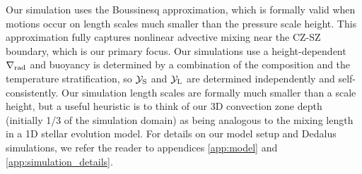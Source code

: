 Our simulation uses the Boussinesq approximation, which is formally valid when motions occur on length scales much smaller than the pressure scale height.
This approximation fully captures nonlinear advective mixing near the CZ-SZ boundary, which is our primary focus.
Our simulations use a height-dependent $\nabla_{\rm{rad}}$ and buoyancy is determined by a combination of the composition and the temperature stratification, so $\mathcal{Y}_{\rm{S}}$ and $\mathcal{Y}_{\rm{L}}$ are determined independently and self-consistently.
Our simulation length scales are formally much smaller than a scale height, but a useful heuristic is to think of our 3D convection zone depth (initially 1/3 of the simulation domain) as being analogous to the mixing length in a 1D stellar evolution model.
For details on our model setup and Dedalus \citep{burns_etal_2020} simulations, we refer the reader to appendices \ref{app:model} and \ref{app:simulation_details}.
